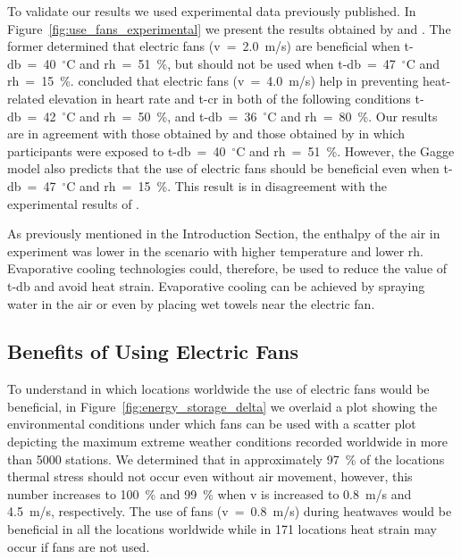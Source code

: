 
To validate our results we used experimental data previously published.
In Figure~\ref{fig:use_fans_experimental} we present the results obtained by  and .
The former determined that electric fans (\ac{v}~=~2.0~m/s) are beneficial when \ac{t-db}~=~40~$^{\circ}$C and \ac{rh}~=~51~\%, but should not be used when \ac{t-db}~=~47~$^{\circ}$C and \ac{rh}~=~15~\%.
 concluded that electric fans (\ac{v}~=~4.0~m/s) help in preventing heat-related elevation in heart rate and \ac{t-cr} in both of the following conditions \ac{t-db}~=~42~$^{\circ}$C and \ac{rh}~=~50~\%, and \ac{t-db}~=~36~$^{\circ}$C and \ac{rh}~=~80~\%.
Our results are in agreement with those obtained by  and those obtained by  in which participants were exposed to \ac{t-db}~=~40~$^{\circ}$C and \ac{rh}~=~51~\%.
However, the Gagge model also predicts that the use of electric fans should be beneficial even when \ac{t-db}~=~47~$^{\circ}$C and \ac{rh}~=~15~\%.
This result is in disagreement with the experimental results of .

As previously mentioned in the Introduction Section, the enthalpy of the air in  experiment was lower in the scenario with higher temperature and lower \ac{rh}.
Evaporative cooling technologies could, therefore, be used to reduce the value of \ac{t-db} and avoid heat strain.
Evaporative cooling can be achieved by spraying water in the air or even by placing wet towels near the electric fan.

\subsection{Benefits of Using Electric Fans}\label{subsec:use-fans}

To understand in which locations worldwide the use of electric fans would be beneficial, in Figure~\ref{fig:energy_storage_delta} we overlaid a plot showing the environmental conditions under which fans can be used with a scatter plot depicting the maximum extreme weather conditions recorded worldwide in more than 5000 stations.
We determined that in approximately 97~\% of the locations thermal stress should not occur even without air movement, however, this number increases to 100~\% and 99~\% when \ac{v} is increased to 0.8~m/s and 4.5~m/s, respectively.
The use of fans (\ac{v}~=~0.8~m/s) during heatwaves would be beneficial in all the locations worldwide while in 171 locations heat strain may occur if fans are not used.

